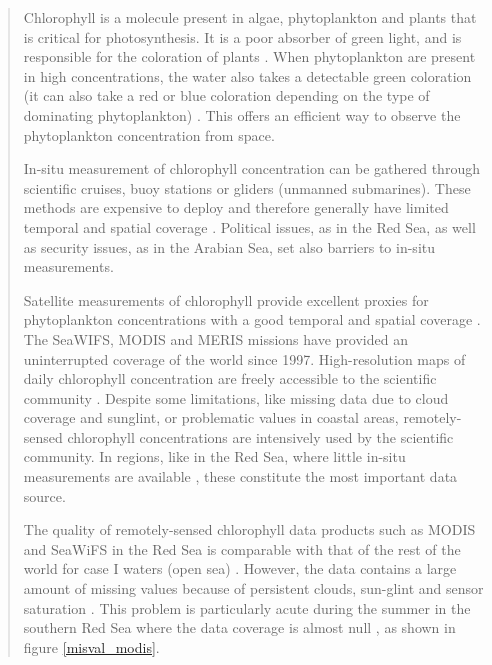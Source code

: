 \begin{quotation} 

Chlorophyll is a molecule present in algae, phytoplankton and
plants that is critical for photosynthesis. It is a poor absorber of green
light, and is responsible for the coloration of plants \citep{Pal2014}. When
phytoplankton are present in high concentrations, the water also takes a
detectable green coloration (it can also take a red or blue coloration
depending on the type of dominating phytoplankton) \citep{Robinson2010}. This
offers an efficient way to observe the phytoplankton concentration from space.

In-situ measurement of chlorophyll concentration can be gathered through
scientific cruises, buoy stations or gliders (unmanned submarines). These
methods are expensive to deploy and therefore generally have limited temporal
and spatial coverage \citep{Robinson2010}. Political issues, as in the Red Sea,
as well as security issues, as in the Arabian Sea, set also barriers to in-situ
measurements.

Satellite measurements of chlorophyll provide excellent proxies for
phytoplankton concentrations with a good temporal and spatial coverage
\citep{Robinson2010}. The SeaWIFS, MODIS and MERIS missions have provided an
uninterrupted coverage of the world since 1997. High-resolution maps of daily
chlorophyll concentration are freely accessible to the scientific community
\citep{McClain2009}. Despite some limitations, like missing data due to cloud
coverage and sunglint, or problematic values in coastal areas, remotely-sensed
chlorophyll concentrations are intensively used by the scientific community. In
regions, like in the Red Sea, where little in-situ measurements are available
\citep{Raitsos2013, Brewin2013}, these constitute the most important data
source.


The quality of remotely-sensed chlorophyll data products such as MODIS and
SeaWiFS in the Red Sea is comparable with that of the rest of the world for
case I waters (open sea) \citep{Brewin2013}. However, the data contains a large
amount of missing values because of persistent clouds, sun-glint and sensor
saturation \citep{Racault}. This problem is particularly acute during the
summer in the southern Red Sea where the data coverage is almost null
\citep{Racault}, as shown in figure \ref{misval_modis}.


\end{quotation}
